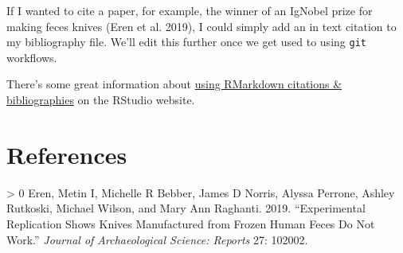 \documentclass[
]{article}
\newlength{\cslhangindent}
\newenvironment{CSLReferences}[3] %
 {%
  \setlength{\parindent}{0pt}
  \ifodd #1 \everypar{\setlength{\hangindent}{\cslhangindent}}\ignorespaces\fi
  \ifnum #2 > 0
  \setlength{\parskip}{#3\baselineskip}
  \fi
 }%
 {}
\begin{document}
If I wanted to cite a paper, for example, the winner of an IgNobel prize
for making feces knives (Eren et al. 2019), I could simply add an in
text citation to my bibliography file. We'll edit this further once we
get used to using \texttt{git} workflows.

There's some great information about
\href{https://rmarkdown.rstudio.com/authoring_bibliographies_and_citations.html}{using
RMarkdown citations \& bibliographies} on the RStudio website.

\hypertarget{references}{%
\section*{References}\label{references}}

\hypertarget{refs}{}
\begin{CSLReferences}{1}{0}
\leavevmode\hypertarget{ref-eren2019experimental}{}%
Eren, Metin I, Michelle R Bebber, James D Norris, Alyssa Perrone, Ashley
Rutkoski, Michael Wilson, and Mary Ann Raghanti. 2019. {``Experimental
Replication Shows Knives Manufactured from Frozen Human Feces Do Not
Work.''} \emph{Journal of Archaeological Science: Reports} 27: 102002.

\end{CSLReferences}
\end{document}
